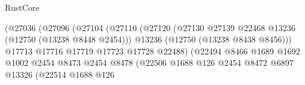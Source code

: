 \begin{lexlean}{RustCore}
\begin{coremodule}
                                                      (@27036
                                                        (@27096
                                                          (@27104
                                                            (@27110
                                                              (@27120
                                                                (@27130
                                                                  @27139
                                                                  @22468
                                                                  @13236
                                                                  (@12750 (@13238 @8448 @2454)))
                                                                @13236
                                                                (@12750 (@13238 @8438 @8456)))
                                                              @17713
                                                              @17716
                                                              @17719
                                                              @17723
                                                              @17728
                                                              @22488)
                                                            (@22494
                                                              @8466
                                                              @1689
                                                              @1692
                                                              @1002
                                                              @2454
                                                              @8473
                                                              @2454
                                                              @8478
                                                              (@22506
                                                                @1688
                                                                @126
                                                                @2454
                                                                @8472
                                                                @6897
                                                                @13326
                                                                (@22514
                                                                  @1688
                                                                  @126

\end{coremodule}
\end{lexlean}
